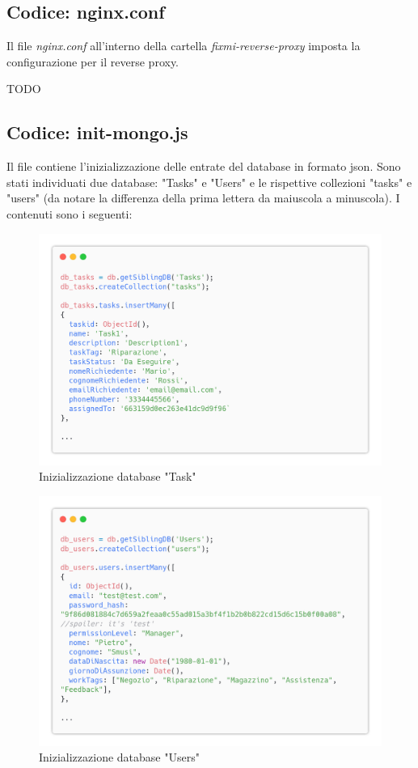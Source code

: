 \documentclass{report}
\begin{document}
\subsection*{Codice: nginx.conf}

Il file \textit{nginx.conf} all'interno della cartella \textit{fixmi-reverse-proxy} imposta la configurazione per il reverse proxy.


TODO

\subsection*{Codice: init-mongo.js}

Il file contiene l'inizializzazione delle entrate del database in formato json. Sono stati individuati due database: "Tasks" e "Users" e le rispettive collezioni "tasks" e "users" (da notare la differenza della prima lettera da maiuscola a minuscola). I contenuti sono i seguenti:
\begin{figure}[H]
	\centering\includegraphics[width=1\textwidth]{images/db-tasks.png}
	Inizializzazione database "Task"
\end{figure}

\begin{figure}[H]
	\centering\includegraphics[width=1\textwidth]{images/db-users.png}
	Inizializzazione database "Users"
\end{figure}
\end{document}
